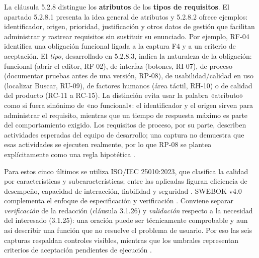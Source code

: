 \documentclass[11pt,a4paper]{article}
\begin{document}
La cláusula 5.2.8 distingue los \textbf{atributos} de los \textbf{tipos de requisitos}. El apartado 5.2.8.1 presenta la idea general de atributos y 5.2.8.2 ofrece ejemplos: identificador, origen, prioridad, justificación y otros datos de gestión que facilitan administrar y rastrear requisitos sin sustituir su enunciado. Por ejemplo, RF-04 identifica una obligación funcional ligada a la captura F4 y a un criterio de aceptación. El \emph{tipo}, desarrollado en 5.2.8.3, indica la naturaleza de la obligación: funcional (abrir el editor, RF-02), de interfaz (botones, RI-07), de proceso (documentar pruebas antes de una versión, RP-08), de usabilidad/calidad en uso (localizar Buscar, RU-09), de factores humanos (área táctil, RH-10) o de calidad del producto (RC-11 a RC-15). La distinción evita usar la palabra «atributo» como si fuera sinónimo de «no funcional»: el identificador y el origen sirven para administrar el requisito, mientras que un tiempo de respuesta máximo es parte del comportamiento exigido. Los requisitos de proceso, por su parte, describen actividades esperadas del equipo de desarrollo; una captura no demuestra que esas actividades se ejecuten realmente, por lo que RP-08 se plantea explícitamente como una regla hipotética \cite{ISO29148}.

Para estos cinco últimos se utiliza ISO/IEC 25010:2023, que clasifica la calidad por características y subcaracterísticas; entre las aplicadas figuran eficiencia de desempeño, capacidad de interacción, fiabilidad y seguridad \cite{ISO25010}. SWEBOK v4.0 complementa el enfoque de especificación y verificación \cite{SWEBOK4}. Conviene separar \emph{verificación} de la redacción (cláusula 3.1.26) y \emph{validación} respecto a la necesidad del interesado (3.1.25): una oración puede ser técnicamente comprobable y aun así describir una función que no resuelve el problema de usuario. Por eso las seis capturas respaldan controles visibles, mientras que los umbrales representan criterios de aceptación pendientes de ejecución \cite{ISO29148}.
\end{document}
